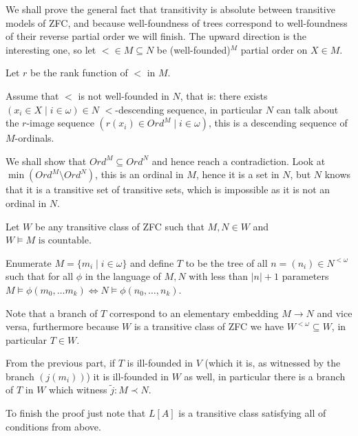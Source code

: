 \begin{cExercise}[Trees][][author][1]
	\begin{cPart}
		We shall prove the general fact that transitivity is absolute between transitive models of ZFC, and because well-foundness of trees correspond to well-foundness of their reverse partial order we will finish. The upward direction is the interesting one, so let $<\in M\subseteq N$ be (well-founded)$^M$ partial order on $X\in M$.
		
		Let $r$ be the rank function of $<$ in $M$.
		
		Assume that $<$ is not well-founded in $N$, that is: there exists $(x_i\in X\mid i\in\omega)\in N$ $<$-descending sequence, in particular $N$ can talk about the $r$-image sequence $(r(x_i)\in Ord^M\mid i\in\omega)$, this is a descending sequence of $M$-ordinals.
		
		We shall show that $Ord^M\subseteq Ord^N$ and hence reach a contradiction. Look at $\min(Ord^M\setminus Ord^N)$, this is an ordinal in $M$, hence it is a set in $N$, but $N$ knows that it is a transitive set of transitive sets, which is impossible as it is not an ordinal in $N$.
	\end{cPart}
	\begin{cPart}
		Let $W$ be any transitive class of ZFC such that $M,N\in W$ and $W\models M\text{ is countable}$.
		
		Enumerate $M=\{m_i\mid i\in\omega\}$ and define $T$ to be the tree of all $n=(n_i)\in N^{<\omega}$ such that for all $\phi$ in the language of $M,N$ with less than $|n| + 1$ parameters $M\models \phi(m_0,\ldots m_k)\iff N\models \phi(n_0,\ldots,n_k)$.
		
		Note that a branch of $T$ correspond to an elementary embedding $M\to N$ and vice versa, furthermore because $W$ is a transitive class of ZFC we have $W^{<\omega}\subseteq W$, in particular $T\in W$.
		
		From the previous part, if $T$ is ill-founded in $V$ (which it is, as witnessed by the branch $(j(m_i))$) it is ill-founded in $W$ as well, in particular there is a branch of $T$ in $W$ which witness $\tilde{j}:M\prec N$.
		
		To finish the proof just note that $L[A]$ is a transitive class satisfying all of conditions from above.
	\end{cPart}
\end{cExercise}
\newpage
